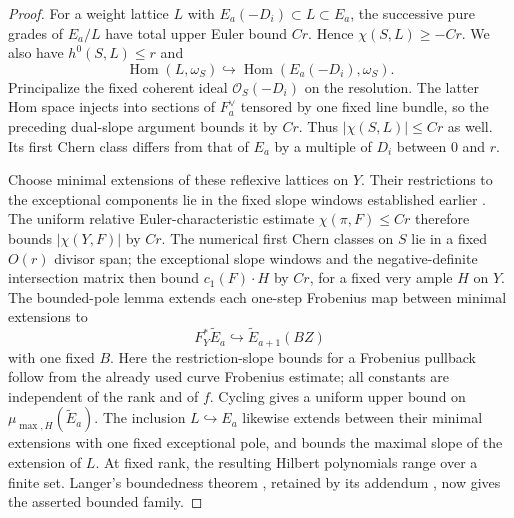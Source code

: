 \begin{proof}
For a weight lattice $L$ with $E_a(-D_i)\subset L\subset E_a$, the successive pure grades of $E_a/L$ have total upper Euler bound $Cr$. Hence $\chi(S,L)\ge-Cr$. We also have $h^0(S,L)\le r$ and
\[\operatorname{Hom}(L,\omega_S)\hookrightarrow\operatorname{Hom}(E_a(-D_i),\omega_S).\]
Principalize the fixed coherent ideal $\mathcal O_S(-D_i)$ on the resolution. The latter Hom space injects into sections of $F_a^\vee$ tensored by one fixed line bundle, so the preceding dual-slope argument bounds it by $Cr$. Thus $|\chi(S,L)|\le Cr$ as well. Its first Chern class differs from that of $E_a$ by a multiple of $D_i$ between $0$ and $r$.

Choose minimal extensions of these reflexive lattices on $Y$. Their restrictions to the exceptional components lie in the fixed slope windows established earlier \citep[Definition~1.2 and Lemma~1.3]{C_Langer2026}. The uniform relative Euler-characteristic estimate $\chi(\pi,F)\le Cr$ therefore bounds $|\chi(Y,F)|$ by $Cr$. The numerical first Chern classes on $S$ lie in a fixed $O(r)$ divisor span; the exceptional slope windows and the negative-definite intersection matrix then bound $c_1(F)\cdot H$ by $Cr$, for a fixed very ample $H$ on $Y$.
The bounded-pole lemma extends each one-step Frobenius map between minimal extensions to
\[F_Y^*\widetilde E_a\hookrightarrow\widetilde E_{a+1}(BZ)\]
with one fixed $B$. Here the restriction-slope bounds for a Frobenius pullback follow from the already used curve Frobenius estimate; all constants are independent of the rank and of $f$. Cycling gives a uniform upper bound on $\mu_{\max,H}(\widetilde E_a)$. The inclusion $L\hookrightarrow E_a$ likewise extends between their minimal extensions with one fixed exceptional pole, and bounds the maximal slope of the extension of $L$. At fixed rank, the resulting Hilbert polynomials range over a finite set. Langer's boundedness theorem \citep[Theorem~4.2, p.~269]{C_LangerBounded2004}, retained by its addendum \citep{C_LangerAddendum2004}, now gives the asserted bounded family.
\end{proof}

